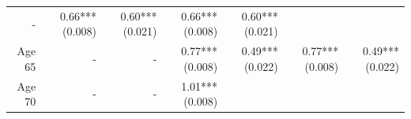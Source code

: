 \documentclass[]{article}
\begin{document}
\begin{longtable}[c]{@{}rrrrrrr@{}}
\begin{minipage}[t]{0.12\columnwidth}
-
\strut\end{minipage} &
\begin{minipage}[t]{0.11\columnwidth}\raggedleft\strut
0.66*** (0.008)
\strut\end{minipage} &
\begin{minipage}[t]{0.12\columnwidth}\raggedleft\strut
0.60*** (0.021)
\strut\end{minipage} &
\begin{minipage}[t]{0.11\columnwidth}\raggedleft\strut
0.66*** (0.008)
\strut\end{minipage} &
\begin{minipage}[t]{0.11\columnwidth}\raggedleft\strut
0.60*** (0.021)
\strut\end{minipage}\tabularnewline
\begin{minipage}[t]{0.12\columnwidth}\raggedleft\strut
Age 65
\strut\end{minipage} &
\begin{minipage}[t]{0.11\columnwidth}\raggedleft\strut
-
\strut\end{minipage} &
\begin{minipage}[t]{0.12\columnwidth}\raggedleft\strut
-
\strut\end{minipage} &
\begin{minipage}[t]{0.11\columnwidth}\raggedleft\strut
0.77*** (0.008)
\strut\end{minipage} &
\begin{minipage}[t]{0.12\columnwidth}\raggedleft\strut
0.49*** (0.022)
\strut\end{minipage} &
\begin{minipage}[t]{0.11\columnwidth}\raggedleft\strut
0.77*** (0.008)
\strut\end{minipage} &
\begin{minipage}[t]{0.11\columnwidth}\raggedleft\strut
0.49*** (0.022)
\strut\end{minipage}\tabularnewline
\begin{minipage}[t]{0.12\columnwidth}\raggedleft\strut
Age 70
\strut\end{minipage} &
\begin{minipage}[t]{0.11\columnwidth}\raggedleft\strut
-
\strut\end{minipage} &
\begin{minipage}[t]{0.12\columnwidth}\raggedleft\strut
-
\strut\end{minipage} &
\begin{minipage}[t]{0.11\columnwidth}\raggedleft\strut
1.01*** (0.008)
\strut\end{minipage} &

\end{longtable}
\end{document}
